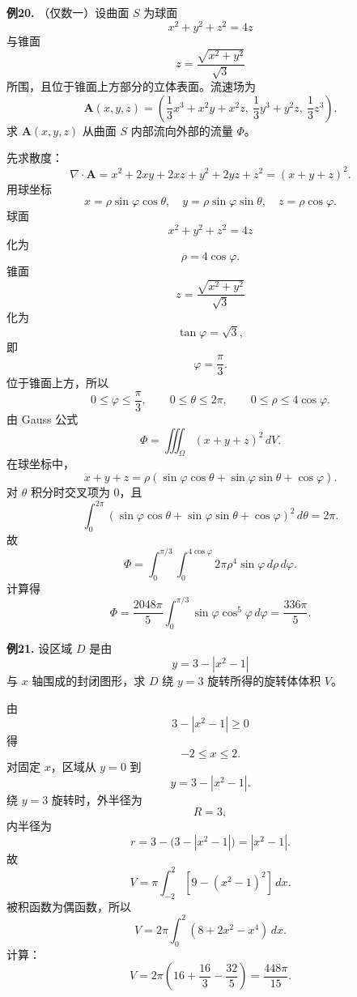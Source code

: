 \begin{problemblock}
\textbf{例20.} （仅数一）设曲面 \(S\) 为球面
\[
x^2+y^2+z^2=4z
\]
与锥面
\[
z=\frac{\sqrt{x^2+y^2}}{\sqrt3}
\]
所围，且位于锥面上方部分的立体表面。流速场为
\[
\mathbf A(x,y,z)=
\left(
\frac13x^3+x^2y+x^2z,\ 
\frac13y^3+y^2z,\ 
\frac13z^3
\right).
\]
求 \(\mathbf A(x,y,z)\) 从曲面 \(S\) 内部流向外部的流量 \(\Phi\)。
\end{problemblock}
\begin{solutionblock}
先求散度：
\[
\nabla\cdot\mathbf A
=x^2+2xy+2xz+y^2+2yz+z^2
=(x+y+z)^2.
\]
用球坐标
\[
x=\rho\sin\varphi\cos\theta,\quad
y=\rho\sin\varphi\sin\theta,\quad
z=\rho\cos\varphi.
\]
球面
\[
x^2+y^2+z^2=4z
\]
化为
\[
\rho=4\cos\varphi.
\]
锥面
\[
z=\frac{\sqrt{x^2+y^2}}{\sqrt3}
\]
化为
\[
\tan\varphi=\sqrt3,
\]
即
\[
\varphi=\frac{\pi}{3}.
\]
位于锥面上方，所以
\[
0\le\varphi\le\frac{\pi}{3},\qquad
0\le\theta\le2\pi,\qquad
0\le\rho\le4\cos\varphi.
\]
由 Gauss 公式
\[
\Phi=\iiint_\Omega (x+y+z)^2\,dV.
\]
在球坐标中，
\[
x+y+z=\rho(\sin\varphi\cos\theta+\sin\varphi\sin\theta+\cos\varphi).
\]
对 \(\theta\) 积分时交叉项为 \(0\)，且
\[
\int_0^{2\pi}
(\sin\varphi\cos\theta+\sin\varphi\sin\theta+\cos\varphi)^2\,d\theta
=2\pi.
\]
故
\[
\Phi=\int_0^{\pi/3}\int_0^{4\cos\varphi}2\pi\rho^4\sin\varphi\,d\rho\,d\varphi.
\]
计算得
\[
\Phi=\frac{2048\pi}{5}\int_0^{\pi/3}\sin\varphi\cos^5\varphi\,d\varphi
=\frac{336\pi}{5}.
\]
\end{solutionblock}

\begin{problemblock}
\textbf{例21.} 设区域 \(D\) 是由
\[
y=3-|x^2-1|
\]
与 \(x\) 轴围成的封闭图形，求 \(D\) 绕 \(y=3\) 旋转所得的旋转体体积 \(V\)。
\end{problemblock}
\begin{solutionblock}
由
\[
3-|x^2-1|\ge0
\]
得
\[
-2\le x\le2.
\]
对固定 \(x\)，区域从 \(y=0\) 到
\[
y=3-|x^2-1|.
\]
绕 \(y=3\) 旋转时，外半径为
\[
R=3,
\]
内半径为
\[
r=3-\bigl(3-|x^2-1|\bigr)=|x^2-1|.
\]
故
\[
V=\pi\int_{-2}^{2}\left[9-(x^2-1)^2\right]\,dx.
\]
被积函数为偶函数，所以
\[
V=2\pi\int_0^2(8+2x^2-x^4)\,dx.
\]
计算：
\[
V=2\pi\left(16+\frac{16}{3}-\frac{32}{5}\right)
=\frac{448\pi}{15}.
\]
\end{solutionblock}

